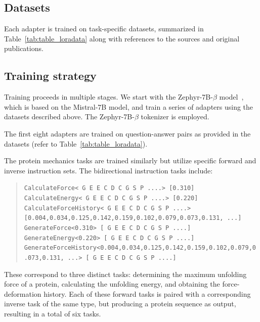 \subsection{Datasets}

Each adapter is trained on task-specific datasets, summarized in Table~\ref{tab:table_loradata} along with references to the sources and original publications.

\subsection{Training strategy} Training proceeds in multiple stages. We start with the Zephyr-7B-$\beta$ model~\cite{HuggingFaceH4/zephyr-7b-betaFace}, which is based on the Mistral-7B model\cite{Jiang2023Mistral7B}, and train a series of adapters using the datasets described above. The Zephyr-7B-$\beta$ tokenizer is employed.

The first eight adapters are trained on question-answer pairs as provided in the datasets (refer to Table~\ref{tab:table_loradata}).

The protein mechanics tasks are trained similarly but utilize specific forward and inverse instruction sets. The bidirectional instruction tasks include:

\begin{quote}
\tiny {\texttt{CalculateForce< G E E C D C G S P ....> [0.310]\\
CalculateEnergy< G E E C D C G S P ....> [0.220]\\ 
CalculateForceHistory< G E E C D C G S P ....> [0.004,0.034,0.125,0.142,0.159,0.102,0.079,0.073,0.131, ...]\\
GenerateForce<0.310>\,[ G E E C D C G S P ....]\\
GenerateEnergy<0.220>\,[ G E E C D C G S P ....]\\
GenerateForceHistory<0.004,0.034,0.125,0.142,0.159,0.102,0.079,0.073,0.131, ...>\,[ G E E C D C G S P ....] }}
\end{quote}

These correspond to three distinct tasks: determining the maximum unfolding force of a protein, calculating the unfolding energy, and obtaining the force-deformation history. Each of these forward tasks is paired with a corresponding inverse task of the same type, but producing a protein sequence as output, resulting in a total of six tasks.

